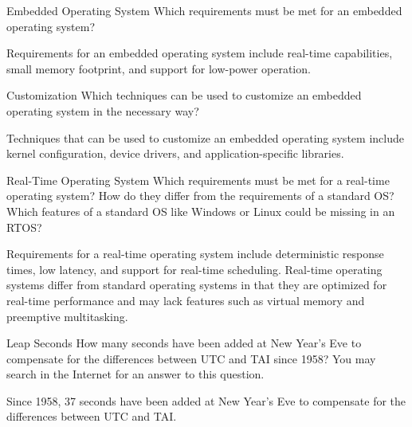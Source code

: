 \documentclass{article}
\begin{document}

\begin{exercise}{Embedded Operating System}
  Which requirements must be met for an embedded operating system?

  \begin{solution}
    Requirements for an embedded operating system include real-time capabilities, small memory footprint, and support for low-power operation.
  \end{solution}
\end{exercise}

\begin{exercise}{Customization}
  Which techniques can be used to customize an embedded operating system in the necessary way?

  \begin{solution}
    Techniques that can be used to customize an embedded operating system include kernel configuration, device drivers, and application-specific libraries.
  \end{solution}
\end{exercise}

\begin{exercise}{Real-Time Operating System}
  Which requirements must be met for a real-time operating system? How do they differ from the requirements of a standard OS? Which features of a standard OS like Windows or Linux could be missing in an RTOS?

  \begin{solution}
    Requirements for a real-time operating system include deterministic response times, low latency, and support for real-time scheduling. Real-time operating systems differ from standard operating systems in that they are optimized for real-time performance and may lack features such as virtual memory and preemptive multitasking.
  \end{solution}
\end{exercise}

\begin{exercise}{Leap Seconds}
  How many seconds have been added at New Year's Eve to compensate for the differences between UTC and TAI since 1958? You may search in the Internet for an answer to this question.

  \begin{solution}
    Since 1958, 37 seconds have been added at New Year's Eve to compensate for the differences between UTC and TAI.
  \end{solution}
\end{exercise}
\end{document}
